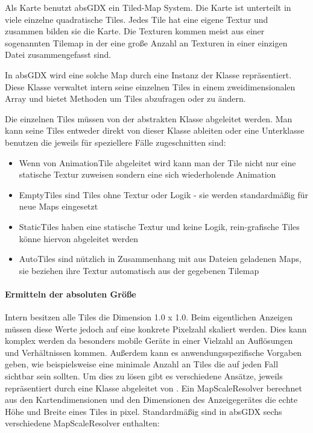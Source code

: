 Als Karte benutzt absGDX ein Tiled-Map System. Die Karte ist unterteilt in viele einzelne quadratische Tiles.
Jedes Tile hat eine eigene Textur und zusammen bilden sie die Karte. Die Texturen kommen meist aus einer sogenannten Tilemap in der eine große Anzahl an Texturen in einer einzigen Datei zusammengefasst sind.


In absGDX wird eine solche Map durch eine Instanz der Klasse  repräsentiert. Diese Klasse verwaltet intern seine einzelnen Tiles in einem zweidimensionalen Array und bietet Methoden um Tiles abzufragen oder zu ändern.

Die einzelnen Tiles müssen von der abstrakten Klasse  abgeleitet werden. Man kann seine Tiles entweder direkt von dieser Klasse ableiten oder eine Unterklasse benutzen die jeweils für speziellere Fälle zugeschnitten sind:

\begin{itemize}
  \item {} Wenn von AnimationTile abgeleitet wird kann man der Tile nicht nur eine statische Textur zuweisen sondern eine sich wiederholende Animation
  \item {} EmptyTiles sind Tiles ohne Textur oder Logik - sie werden standardmäßig für neue Maps eingesetzt
  \item {} StaticTiles haben eine statische Textur und	keine Logik, rein-grafische Tiles könne hiervon abgeleitet werden
  \item {} AutoTiles sind nützlich in Zusammenhang mit aus Dateien geladenen Maps, sie beziehen ihre Textur automatisch aus der gegebenen Tilemap
\end{itemize}

\paragraph{Ermitteln der absoluten Größe}

Intern besitzen alle Tiles die Dimension 1.0 x 1.0. Beim eigentlichen Anzeigen müssen diese Werte jedoch auf eine konkrete Pixelzahl skaliert werden. Dies kann komplex werden da besonders mobile Geräte in einer Vielzahl an Auflösungen und Verhältnissen kommen. Außerdem kann es anwendungsspezifische Vorgaben geben, wie beispielsweise eine minimale Anzahl an Tiles die auf jeden Fall sichtbar sein sollten.
Um dies zu lösen gibt es verschiedene Ansätze, jeweils repräsentiert durch eine Klasse abgeleitet von .
Ein MapScaleResolver berechnet aus den Kartendimensionen und den Dimensionen des Anzeigegerätes die echte Höhe und Breite eines Tiles in pixel.
Standardmäßig sind in absGDX sechs verschiedene MapScaleResolver enthalten:

